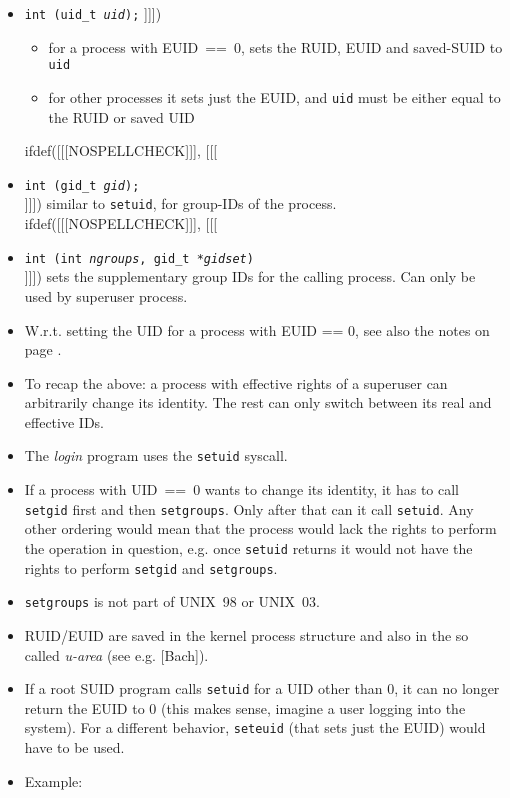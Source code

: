 \begin{slide}
\begin{itemize}
ifdef([[[NOSPELLCHECK]]], [[[
\item \texttt{int (uid\_t \emph{uid});}
]]])
    \begin{itemize}
    \item for a process with EUID~==~0, sets the RUID, EUID and saved-SUID to
    \texttt{uid}
    \item for other processes it sets just the EUID, and \texttt{uid} must be
    either equal to the RUID or saved UID
    \end{itemize}
ifdef([[[NOSPELLCHECK]]], [[[
\item \texttt{int (gid\_t \emph{gid});} \\
]]])
similar to \texttt{setuid}, for group-IDs of the process.
ifdef([[[NOSPELLCHECK]]], [[[
\item \texttt{int (int \emph{ngroups},
gid\_t *\emph{gidset})} \\
]]])
sets the supplementary group IDs for the calling process. Can only be used
by superuser process.
\end{itemize}
\end{slide}

\begin{itemize}
\item W.r.t. setting the UID for a process with EUID == 0, see also the notes on
page \pageref{ROOT_SETUID}.
\item To recap the above: a process with effective rights of a superuser can
arbitrarily change its identity. The rest can only switch between its real and
effective IDs.
\item The \emph{login} program uses the \texttt{setuid} syscall.
\item If a process with UID~==~0 wants to change its identity, it has to call
\texttt{setgid} first and then \texttt{setgroups}. Only after that can it call
\texttt{setuid}. Any other ordering would mean that the process would lack the
rights to perform the operation in question, e.g. once \texttt{setuid} returns
it would not have the rights to perform \texttt{setgid} and \texttt{setgroups}.
\item \texttt{setgroups} is not part of UNIX~98 or UNIX~03.
\item RUID/EUID are saved in the kernel process structure and also in the so
called \emph{u-area} (see e.g. [Bach]).
\item If a root SUID program calls \texttt{setuid} for a UID other than 0, it
can no longer return the EUID to 0 (this makes sense, imagine a user logging
into the system). For a different behavior, \texttt{seteuid} (that sets just the
EUID) would have to be used.
\item Example: 
\end{itemize}

\endinput
